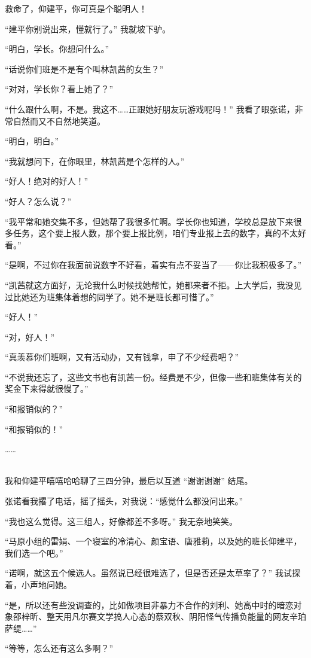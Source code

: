 \documentclass[UTF8]{ctexart}
\begin{document}
救命了，仰建平，你可真是个聪明人！

“建平你别说出来，懂就行了。” 我就坡下驴。

“明白，学长。你想问什么。”

“话说你们班是不是有个叫林凯茜的女生？”

“对对，学长你？看上她了？”

“什么跟什么啊，不是。我这不……正跟她好朋友玩游戏呢吗！” 我看了眼张诺，非常自然而又不自然地笑道。

“明白，明白。”

“我就想问下，在你眼里，林凯茜是个怎样的人。”

“好人！绝对的好人！”

“好人？怎么说？”

“我平常和她交集不多，但她帮了我很多忙啊。学长你也知道，学校总是放下来很多任务，这个要上报人数，那个要上报比例，咱们专业报上去的数字，真的不太好看。”

“是啊，不过你在我面前说数字不好看，着实有点不妥当了——你比我积极多了。”

“凯茜就这方面好，无论我什么时候找她帮忙，她都来者不拒。上大学后，我没见过比她还为班集体着想的同学了。她不是班长都可惜了。”

“好人！”

“对，好人！”

“真羡慕你们班啊，又有活动办，又有钱拿，申了不少经费吧？”

“不说我还忘了，这些文书也有凯茜一份。经费是不少，但像一些和班集体有关的奖金下来得就很慢了。”

“和报销似的？”

“和报销似的！”

……

~\\

我和仰建平嘻嘻哈哈聊了三四分钟，最后以互道 “谢谢谢谢” 结尾。

张诺看我撂了电话，摇了摇头，对我说：“感觉什么都没问出来。”

“我也这么觉得。这三组人，好像都差不多呀。” 我无奈地笑笑。

“马原小组的雷娟、一个寝室的冷清心、颜宝语、唐雅莉，以及她的班长仰建平，我们选一个吧。”

“诺啊，就这五个候选人。虽然说已经很难选了，但是否还是太草率了？” 我试探着，小声地问她。

“是，所以还有些没调查的，比如做项目非暴力不合作的刘利、她高中时的暗恋对象邵梓昕、整天用凡尔赛文学搞人心态的蔡双秋、阴阳怪气传播负能量的网友辛珀萨缇……”

“等等，怎么还有这么多啊？”
\end{document}
